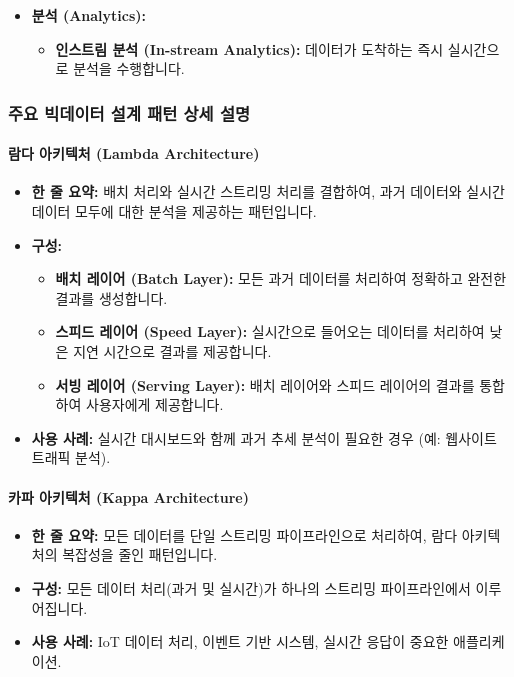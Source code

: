 \documentclass[11pt,a4paper]{article}
\begin{document}
\begin{itemize}
\begin{itemize}
        \item \textbf{비정규화된 와이드 테이블 (Denormalized Wide Tables):} 조인(join) 작업을 피하기 위해 데이터를 미리 비정규화하여 저장합니다.
        \item \textbf{다중 목적지 (Multiple Destinations):} 데이터 파이프라인이 여러 소비자에게 다양한 요구사항에 맞춰 데이터를 분산하여 제공합니다.
    \end{itemize}
    \item \textbf{분석 (Analytics):}
    \begin{itemize}
        \item \textbf{인스트림 분석 (In-stream Analytics):} 데이터가 도착하는 즉시 실시간으로 분석을 수행합니다.
    \end{itemize}
\end{itemize}

\subsubsection{주요 빅데이터 설계 패턴 상세 설명}

\paragraph{람다 아키텍처 (Lambda Architecture)}
\begin{itemize}
    \item \textbf{한 줄 요약:} 배치 처리와 실시간 스트리밍 처리를 결합하여, 과거 데이터와 실시간 데이터 모두에 대한 분석을 제공하는 패턴입니다.
    \item \textbf{구성:}
    \begin{itemize}
        \item \textbf{배치 레이어 (Batch Layer):} 모든 과거 데이터를 처리하여 정확하고 완전한 결과를 생성합니다.
        \item \textbf{스피드 레이어 (Speed Layer):} 실시간으로 들어오는 데이터를 처리하여 낮은 지연 시간으로 결과를 제공합니다.
        \item \textbf{서빙 레이어 (Serving Layer):} 배치 레이어와 스피드 레이어의 결과를 통합하여 사용자에게 제공합니다.
    \end{itemize}
    \item \textbf{사용 사례:} 실시간 대시보드와 함께 과거 추세 분석이 필요한 경우 (예: 웹사이트 트래픽 분석).
\end{itemize}

\paragraph{카파 아키텍처 (Kappa Architecture)}
\begin{itemize}
    \item \textbf{한 줄 요약:} 모든 데이터를 단일 스트리밍 파이프라인으로 처리하여, 람다 아키텍처의 복잡성을 줄인 패턴입니다.
    \item \textbf{구성:} 모든 데이터 처리(과거 및 실시간)가 하나의 스트리밍 파이프라인에서 이루어집니다.
    \item \textbf{사용 사례:} IoT 데이터 처리, 이벤트 기반 시스템, 실시간 응답이 중요한 애플리케이션.
\end{itemize}
\end{document}
